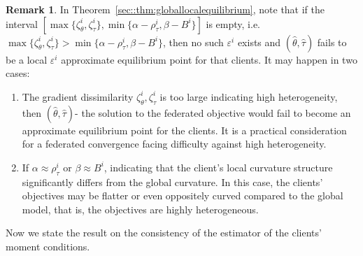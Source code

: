 \documentclass{article}
\theoremstyle{definition}
\newtheorem{remark}{Remark}%
\begin{document}
    \begin{remark}
       In Theorem~\ref{sec::thm:globallocalequilibrium}, note that if the interval $[\max\{ \zeta_{\theta}^i, \zeta_{\tau}^i\}, \min\{\alpha-\rho_{\tau}^i,\beta- B^i \}]$ is empty, i.e. $\max\{ \zeta_{\theta}^i, \zeta_{\tau}^i\}>\min\{\alpha-\rho_{\tau}^i,\beta- B^i \}$,  then no such $\varepsilon^i$ exists and $(\hat\theta,\hat\tau)$ fails to be a local $\varepsilon^i$ approximate equilibrium point for that clients. It may happen in two cases:
       \begin{enumerate}[parsep=0pt,topsep=0pt,leftmargin=*,itemsep=0pt]
           \item The gradient dissimilarity $\zeta_{\theta}^i, \zeta_{\tau}^i$ is too large indicating high heterogeneity, then $(\hat\theta,\hat\tau)$- the solution to the federated objective would fail to become an approximate equilibrium point for the clients. It is a practical consideration for a federated convergence facing difficulty against high heterogeneity. 
           \item If $\alpha\approx\rho_{\tau}^i$ or $\beta\approx B^i$, indicating that the client’s local curvature structure significantly differs from the global curvature. In this case, the clients' objectives may be flatter or even oppositely curved compared to the global model, that is, the objectives are highly heterogeneous.
       \end{enumerate} 
    \end{remark}
    
    Now we state the result on the consistency of the estimator of the clients' moment conditions.
\end{document}

